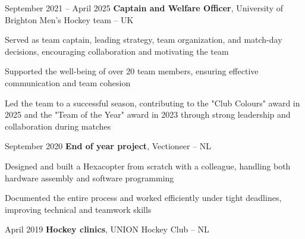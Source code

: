 	
	\vspace{0.2 cm}
	
	\begin{twocolentry}{
			September 2021 – April 2025
		}
		\textbf{Captain and Welfare Officer}, University of Brighton Men’s Hockey team -- UK
	\end{twocolentry}
	
	\vspace{0.10 cm}
	\begin{onecolentry}
		\begin{highlights}
			\item Served as team captain, leading strategy, team organization, and match-day decisions, encouraging collaboration and motivating the team
			\item Supported the well-being of over 20 team members, ensuring effective communication and team cohesion
			\item Led the team to a successful season, contributing to the "Club Colours" award in 2025 and the "Team of the Year" award in 2023 through strong leadership and collaboration during matches
		\end{highlights}
	\end{onecolentry}
	
	\vspace{0.2 cm}
	
	\begin{twocolentry}{
			September 2020
		}
		\textbf{End of year project}, Vectioneer -- NL
	\end{twocolentry}
	
	\vspace{0.10 cm}
	\begin{onecolentry}
		\begin{highlights}
			\item Designed and built a Hexacopter from scratch with a colleague, handling both hardware assembly and software programming
			\item Documented the entire process and worked efficiently under tight deadlines, improving technical and teamwork skills
		\end{highlights}
	\end{onecolentry}
	
	\vspace{0.2 cm}
	
	\begin{twocolentry}{
			April 2019
		}
		\textbf{Hockey clinics}, UNION Hockey Club -- NL
	\end{twocolentry}
	
